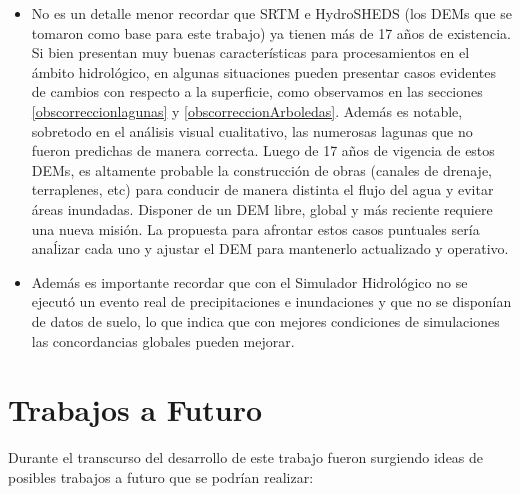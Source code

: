 \documentclass[10pt,a4paper, twoside]{report}
\begin{document}
\begin{itemize}
		\item No es un detalle menor recordar que SRTM e HydroSHEDS (los DEMs que se tomaron como base para este trabajo) ya tienen más de 17 años de existencia. Si bien presentan muy buenas características para procesamientos en el ámbito hidrológico, en algunas situaciones pueden presentar casos evidentes de cambios con respecto a la superficie, como observamos en las secciones \ref{obscorreccionlagunas} y \ref{obscorreccionArboledas}. Además es notable, sobretodo en el análisis visual cualitativo, las numerosas lagunas que no fueron predichas de manera correcta. Luego de 17 años de vigencia de estos DEMs, es altamente probable la construcción de obras (canales de drenaje, terraplenes, etc) para conducir de manera distinta el flujo del agua y evitar áreas inundadas. Disponer de un DEM libre, global y más reciente requiere una nueva misión. La propuesta para afrontar estos casos puntuales sería anaĺizar cada uno y ajustar el DEM para mantenerlo actualizado y operativo.
		\item Además es importante recordar que con el Simulador Hidrológico no se ejecutó un evento real de precipitaciones e inundaciones y que no se disponían de datos de suelo, lo que indica que con mejores condiciones de simulaciones las concordancias globales pueden mejorar.
		
		
\end{itemize}

\section{Trabajos a Futuro}

Durante el transcurso del desarrollo de este trabajo fueron surgiendo ideas de posibles trabajos a futuro que se podrían realizar:
\end{document}
